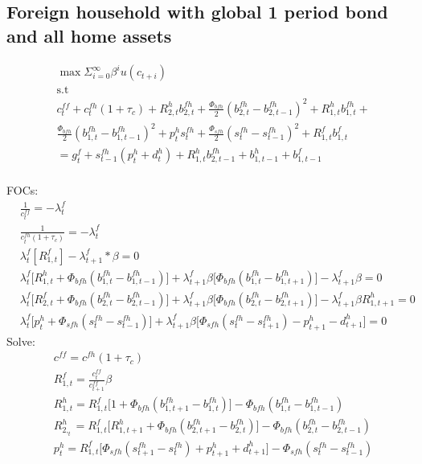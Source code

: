 \documentclass[a4paper]{article}
\begin{document}
\subsection{Foreign household with global 1 period bond and all home assets}
\begin{align*}
&\max \Sigma_{i=0}^\infty \beta^i u(c_{t+i})\\ &\text{s.t}\\
&c^{ff}_t+c^{fh}_t(1+\tau_c)+R^h_{2,t} b^{fh}_{2,t} + \frac{\Phi_{bfh}}{2}(b^{fh}_{2,t}-b^{fh}_{2,t-1})^2 +
R^h_{1,t} b^{fh}_{1,t} + \\ 
&\frac{\Phi_{bfh}}{2}(b^{fh}_{1,t}-b^{fh}_{1,t-1})^2 + p^{h}_t s^{fh}_t+\frac{\Phi_{sfh}}{2}(s^{fh}_t-s^{fh}_{t-1})^2+R^f_{1,t}b^f_{1,t}\\&=g^f_t+s^{fh}_{t-1}(p^{h}_t+d^{h}_t)+R^{h}_{1,t}b^{fh}_{2,t-1}+b^h_{1,t-1}+b^f_{1,t-1}\\
\end{align*}


FOCs:
\begin{align*}
&\frac{1}{c^{ff}_t}=-\lambda^f_t\\
&\frac{1}{c^{fh}_t(1+\tau_c)}=-\lambda^f_t \\
&\lambda^f_t [R^f_{1,t}]-\lambda^f_{t+1}*\beta=0\\
&\lambda^f_t\big[R^h_{1,t}+\Phi_{bfh} (b^{fh}_{1,t}-b^{fh}_{1,t-1})\big ]+ \lambda^f_{t+1} \beta \big[\Phi_{bfh} (b^{fh}_{1,t} - b^{fh}_{1,t+1})]-\lambda^f_{t+1}\beta =0\\
&\lambda^f_t\big[R^f_{2,t}+\Phi_{bfh} (b^{fh}_{2,t}-b^{fh}_{2,t-1})\big ]+ \lambda^f_{t+1} \beta \big[\Phi_{bfh} (b^{fh}_{2,t} - b^{fh}_{2,t+1})]-\lambda^f_{t+1}\beta R^{h}_{1,t+1}=0\\
&\lambda^f_t \big[p^{h}_t + \Phi_{sfh} (s^{fh}_t-s^{fh}_{t-1})\big] + \lambda^f_{t+1} \beta \big[\Phi_{sfh}  (s^{fh}_t-s^{fh}_{t+1}) - p^{h}_{t+1}-d^{h}_{t+1}\big]=0
\end{align*}
Solve:
\begin{align}
&c^{ff}=c^{fh}(1+\tau_c)\\
&R^f_{1,t}=\frac{c^{ff}_t}{c^{ff}_{t+1}}\beta\\
&R^h_{1,t}=R^f_{1,t} \big[1+\Phi_{bfh} (b^{fh}_{1,t+1} - b^{fh}_{1,t})\big] -\Phi_{bfh} (b^{fh}_{1,t}-b^{fh}_{1,t-1})\\
&R^h_{2,_t}=R^f_{1,t} \big[R^{h}_{1,t+1}+\Phi_{bfh} (b^{fh}_{2,t+1} - b^{fh}_{2,t})\big] -\Phi_{bfh} (b^{fh}_{2,t}-b^{fh}_{2,t-1})\\
&p^{h}_t=R^f_{1,t} \bigg[ \Phi_{sfh} (s^{fh}_{t+1}-s^{fh}_t)+p^{h}_{t+1}+d^{h}_{t+1} \bigg] - \Phi_{sfh} (s^{fh}_t - s^{fh}_{t-1})
\end{align}
\end{document}
